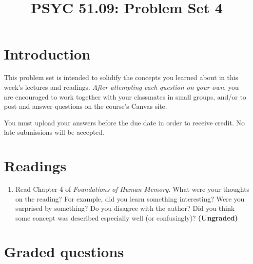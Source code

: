 \documentclass[10pt]{article}
\title{PSYC 51.09: Problem Set 4}
\date{}
\begin{document}
\maketitle
\vspace{-0.75in}
\section*{Introduction}
This problem set is intended to solidify the concepts you learned
about in this week’s lectures and readings.  \textit{After attempting each question
  on your own}, you are encouraged to work together with your classmates in small groups, and/or to post and answer questions on the course’s Canvas site.

You must upload your answers before the due date in order to receive credit.  No late submissions will be accepted.

\section*{Readings}
\begin{enumerate}
\item Read Chapter 4 of \textit{Foundations of Human Memory}.  What were your thoughts on the reading?  For example, did you learn something interesting?  Were you surprised by something?  Do you disagree with the author?  Did you think some concept was described especially well (or confusingly)?  \textbf{(Ungraded)}
\end{enumerate}

\section*{Graded questions}
\end{document}
